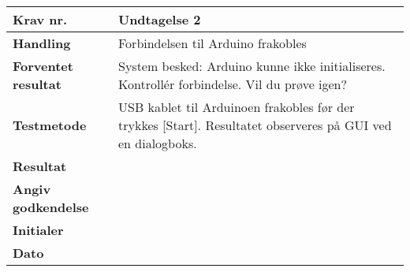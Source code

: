 	\begin{center}
		\begin{longtable}{ | m{4cm}| m{8.5cm}|} 
			\hline
			\textbf{Krav nr.} & Undtagelse 2   \\ 
			\hline
			\textbf{Handling} & Forbindelsen til Arduino frakobles  \\
			\hline
			\textbf{Forventet resultat} & System besked: Arduino kunne ikke initialiseres. Kontrollér forbindelse. Vil du prøve igen? \\
			\hline
			\textbf{Testmetode}  & USB kablet til Arduinoen frakobles før der trykkes [Start]. Resultatet observeres på GUI ved en dialogboks.   \\
			\hline
			\textbf{Resultat}  &    \\
			\hline
			\textbf{Angiv godkendelse} &     \\
			\hline
			\textbf{Initialer} &     \\
			\hline
			\textbf{Dato} &    \\
			\hline
		\end{longtable}
	\end{center}
	
\newpage	
	
	
